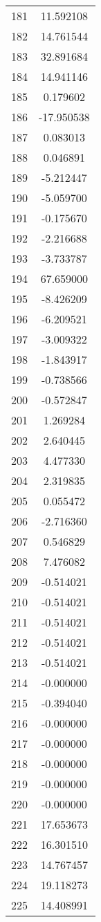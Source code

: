 \documentclass[12pt]{article}
\begin{document}
\begin{longtable}{@{}cc@{}}
181 & 11.592108 \\
182 & 14.761544 \\
183 & 32.891684 \\
184 & 14.941146 \\
185 & 0.179602 \\
186 & -17.950538 \\
187 & 0.083013 \\
188 & 0.046891 \\
189 & -5.212447 \\
190 & -5.059700 \\
191 & -0.175670 \\
192 & -2.216688 \\
193 & -3.733787 \\
194 & 67.659000 \\
195 & -8.426209 \\
196 & -6.209521 \\
197 & -3.009322 \\
198 & -1.843917 \\
199 & -0.738566 \\
200 & -0.572847 \\
201 & 1.269284 \\
202 & 2.640445 \\
203 & 4.477330 \\
204 & 2.319835 \\
205 & 0.055472 \\
206 & -2.716360 \\
207 & 0.546829 \\
208 & 7.476082 \\
209 & -0.514021 \\
210 & -0.514021 \\
211 & -0.514021 \\
212 & -0.514021 \\
213 & -0.514021 \\
214 & -0.000000 \\
215 & -0.394040 \\
216 & -0.000000 \\
217 & -0.000000 \\
218 & -0.000000 \\
219 & -0.000000 \\
220 & -0.000000 \\
221 & 17.653673 \\
222 & 16.301510 \\
223 & 14.767457 \\
224 & 19.118273 \\
225 & 14.408991 \\

\end{longtable}
\end{document}
